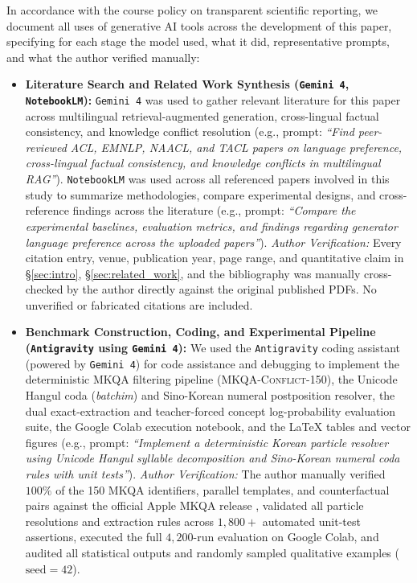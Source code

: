 In accordance with the course policy on transparent scientific reporting, we document all uses of generative AI tools across the development of this paper, specifying for each stage the model used, what it did, representative prompts, and what the author verified manually:
\begin{itemize}
    \item \textbf{Literature Search and Related Work Synthesis (\texttt{Gemini 4}, \texttt{NotebookLM}):} \texttt{Gemini 4} was used to gather relevant literature for this paper across multilingual retrieval-augmented generation, cross-lingual factual consistency, and knowledge conflict resolution (e.g., prompt: \emph{``Find peer-reviewed ACL, EMNLP, NAACL, and TACL papers on language preference, cross-lingual factual consistency, and knowledge conflicts in multilingual RAG''}). \texttt{NotebookLM} was used across all referenced papers involved in this study to summarize methodologies, compare experimental designs, and cross-reference findings across the literature (e.g., prompt: \emph{``Compare the experimental baselines, evaluation metrics, and findings regarding generator language preference across the uploaded papers''}). \emph{Author Verification:} Every citation entry, venue, publication year, page range, and quantitative claim in \S\ref{sec:intro}, \S\ref{sec:related_work}, and the bibliography was manually cross-checked by the author directly against the original published PDFs. No unverified or fabricated citations are included.
    \item \textbf{Benchmark Construction, Coding, and Experimental Pipeline (\texttt{Antigravity} using \texttt{Gemini 4}):} We used the \texttt{Antigravity} coding assistant (powered by \texttt{Gemini 4}) for code assistance and debugging to implement the deterministic MKQA filtering pipeline (\textsc{MKQA-Conflict-150}), the Unicode Hangul coda (\emph{batchim}) and Sino-Korean numeral postposition resolver, the dual exact-extraction and teacher-forced concept log-probability evaluation suite, the Google Colab execution notebook, and the LaTeX tables and vector figures (e.g., prompt: \emph{``Implement a deterministic Korean particle resolver using Unicode Hangul syllable decomposition and Sino-Korean numeral coda rules with unit tests''}). \emph{Author Verification:} The author manually verified $100\%$ of the 150 MKQA identifiers, parallel templates, and counterfactual pairs against the official Apple MKQA release \citep{longpre2021mkqa}, validated all particle resolutions and extraction rules across $1{,}800+$ automated unit-test assertions, executed the full $4{,}200$-run evaluation on Google Colab, and audited all statistical outputs and randomly sampled qualitative examples ($\text{seed}{=}42$).

\end{itemize}
